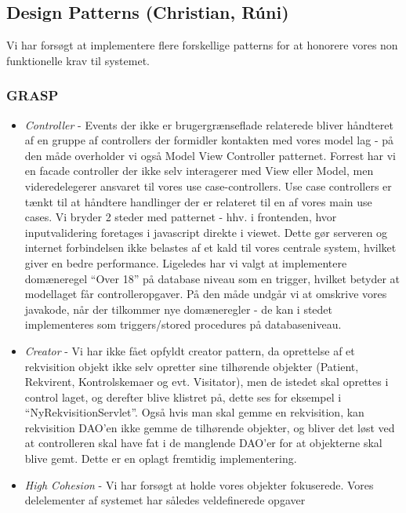 \subsection*{Design Patterns (Christian, Rúni)}
 \label{design_patterns}
Vi har forsøgt at implementere flere forskellige patterns for at honorere vores
non funktionelle krav til systemet.
\subsubsection*{GRASP\cite{larman}}
\begin{itemize}
  \item \emph{Controller} - Events der ikke er brugergrænseflade relaterede
  bliver håndteret af en gruppe af controllers der formidler kontakten med vores
  model lag - på den måde overholder vi også Model View Controller patternet.
  Forrest har vi en facade controller der ikke selv interagerer med View eller
  Model, men videredelegerer ansvaret til vores use case-controllers. Use case
  controllers er tænkt til at håndtere handlinger der er relateret til en af
  vores main use cases. Vi bryder 2 steder med patternet - hhv. i frontenden,
  hvor inputvalidering foretages i javascript direkte i viewet. Dette gør
  serveren og internet forbindelsen ikke belastes af et kald til vores centrale
  system, hvilket giver en bedre performance. Ligeledes har vi valgt at
  implementere domæneregel “Over 18” på database niveau som en trigger, hvilket
  betyder at modellaget får controlleropgaver. På den måde undgår vi at omskrive
  vores javakode, når der tilkommer nye domæneregler - de kan i stedet
  implementeres som triggers/stored procedures på databaseniveau.
  \item \emph{Creator} - Vi har ikke fået opfyldt creator pattern, da
  oprettelse af et rekvisition objekt ikke selv opretter sine tilhørende objekter (Patient,
  Rekvirent, Kontrolskemaer og evt. Visitator), men de istedet skal oprettes i
  control laget, og derefter blive klistret på, dette ses for eksempel i
  “NyRekvisitionServlet”. Også hvis man skal gemme en rekvisition, kan
  rekvisition DAO’en ikke gemme de tilhørende objekter, og bliver det løst ved
  at controlleren skal have fat i de manglende DAO’er for at objekterne skal
  blive gemt. Dette er en oplagt fremtidig implementering.
  \item \emph{High Cohesion} - Vi har forsøgt at holde vores objekter
  fokuserede. Vores delelementer af systemet har således veldefinerede opgaver

\end{itemize}
